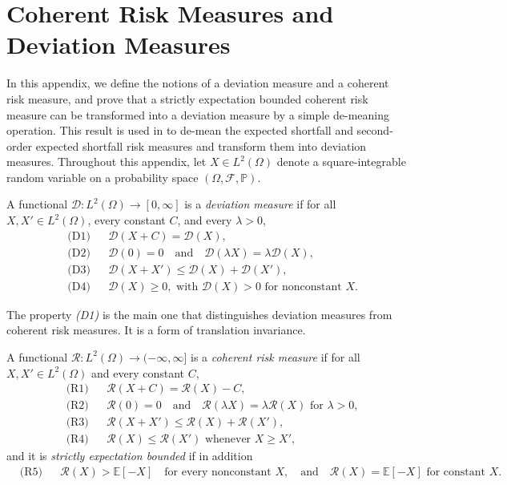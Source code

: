 \chapter{Coherent Risk Measures and Deviation Measures} \label{app:demeaning}

In this appendix, we define the notions of a deviation measure and a coherent risk measure, and prove that a strictly expectation bounded coherent risk measure can be transformed into a deviation measure by a simple de-meaning operation. This result is used in  to de-mean the expected shortfall and second-order expected shortfall risk measures and transform them into deviation measures. Throughout this appendix, let $X \in L^2(\Omega)$ denote a square-integrable
random variable on a probability space $(\Omega, \mathcal{F}, \mathbb{P})$.

\begin{definition}\label{def:deviation}
A functional $\mathcal{D} : L^2(\Omega) \to [0, \infty]$ is a \emph{deviation measure} if for all
$X, X' \in L^2(\Omega)$, every constant $C$, and every $\lambda > 0$,
\begin{align*}
&\text{(D1)} && \mathcal{D}(X + C) = \mathcal{D}(X), \\
&\text{(D2)} && \mathcal{D}(0) = 0 \quad \text{and} \quad \mathcal{D}(\lambda X) = \lambda \mathcal{D}(X), \\
&\text{(D3)} && \mathcal{D}(X + X') \leq \mathcal{D}(X) + \mathcal{D}(X'), \\
&\text{(D4)} && \mathcal{D}(X) \geq 0, \text{ with } \mathcal{D}(X) > 0 \text{ for nonconstant } X .
\end{align*}
\end{definition}


The property \emph{(D1)} is the main one that distinguishes deviation measures from coherent risk measures. It is a form of translation invariance. 

\begin{definition}\label{def:coherent}
A functional $\mathcal{R} : L^2(\Omega) \to (-\infty, \infty]$ is a \emph{coherent risk measure} if for all
$X, X' \in L^2(\Omega)$ and every constant $C$,
\begin{align*}
&\text{(R1)} && \mathcal{R}(X + C) = \mathcal{R}(X) - C, \\
&\text{(R2)} && \mathcal{R}(0) = 0 \quad \text{and} \quad \mathcal{R}(\lambda X) = \lambda \mathcal{R}(X) \text{ for } \lambda > 0, \\
&\text{(R3)} && \mathcal{R}(X + X') \leq \mathcal{R}(X) + \mathcal{R}(X'), \\
&\text{(R4)} && \mathcal{R}(X) \leq \mathcal{R}(X') \text{ whenever } X \geq X' ,
\end{align*}
and it is \emph{strictly expectation bounded} if in addition
\begin{align*}
&\text{(R5)} && \mathcal{R}(X) > \mathbb{E}[-X] \quad \text{for every nonconstant }X,\quad \text{and} \quad \mathcal{R}(X) = \mathbb{E}[-X] \text{ for constant } X.
\end{align*}
\end{definition}

